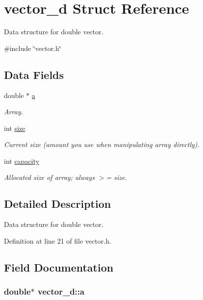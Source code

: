 \hypertarget{structvector__d}{
\section{vector\_\-d Struct Reference}
\label{structvector__d}
}


Data structure for double vector.  




{\ttfamily \#include \char`\"{}vector.h\char`\"{}}

\subsection*{Data Fields}
\begin{DoxyCompactItemize}
\item 
double $\ast$ \hyperlink{structvector__d_a925832a4ece20022fbe241e7e38ec329}{a}
\begin{DoxyCompactList}\small\item\em Array. \item\end{DoxyCompactList}\item 
int \hyperlink{structvector__d_a0267fa83b14889786ec36cdbe78a71b3}{size}
\begin{DoxyCompactList}\small\item\em Current size (amount you use when manipulating array directly). \item\end{DoxyCompactList}\item 
int \hyperlink{structvector__d_acc924985e421a81b7acb5a2ee8eecfaa}{capacity}
\begin{DoxyCompactList}\small\item\em Allocated size of array; always $>$= size. \item\end{DoxyCompactList}\end{DoxyCompactItemize}


\subsection{Detailed Description}
Data structure for double vector. 

Definition at line 21 of file vector.h.



\subsection{Field Documentation}
\hypertarget{structvector__d_a925832a4ece20022fbe241e7e38ec329}{
\subsubsection[{a}]{\setlength{\rightskip}{0pt plus 5cm}double$\ast$ {\bf vector\_\-d::a}}}
\label{structvector__d_a925832a4ece20022fbe241e7e38ec329}



